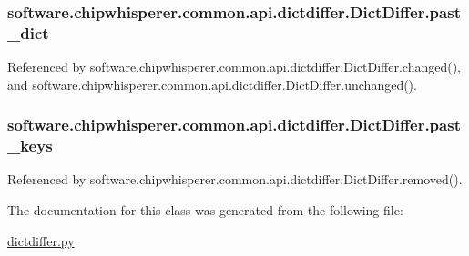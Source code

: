 \subsubsection[{past\+\_\+dict}]{\setlength{\rightskip}{0pt plus 5cm}software.\+chipwhisperer.\+common.\+api.\+dictdiffer.\+Dict\+Differ.\+past\+\_\+dict}\label{classsoftware_1_1chipwhisperer_1_1common_1_1api_1_1dictdiffer_1_1DictDiffer_a5ea256bc3eaea57ca7b5c0fedafa7f26}


Referenced by software.\+chipwhisperer.\+common.\+api.\+dictdiffer.\+Dict\+Differ.\+changed(), and software.\+chipwhisperer.\+common.\+api.\+dictdiffer.\+Dict\+Differ.\+unchanged().

\hypertarget{classsoftware_1_1chipwhisperer_1_1common_1_1api_1_1dictdiffer_1_1DictDiffer_a02ddc9b7c09c5cad76b4fa4e6c7572e3}{}
\subsubsection[{past\+\_\+keys}]{\setlength{\rightskip}{0pt plus 5cm}software.\+chipwhisperer.\+common.\+api.\+dictdiffer.\+Dict\+Differ.\+past\+\_\+keys}\label{classsoftware_1_1chipwhisperer_1_1common_1_1api_1_1dictdiffer_1_1DictDiffer_a02ddc9b7c09c5cad76b4fa4e6c7572e3}


Referenced by software.\+chipwhisperer.\+common.\+api.\+dictdiffer.\+Dict\+Differ.\+removed().



The documentation for this class was generated from the following file\+:\begin{DoxyCompactItemize}
\item 
\hyperlink{dictdiffer_8py}{dictdiffer.\+py}\end{DoxyCompactItemize}
